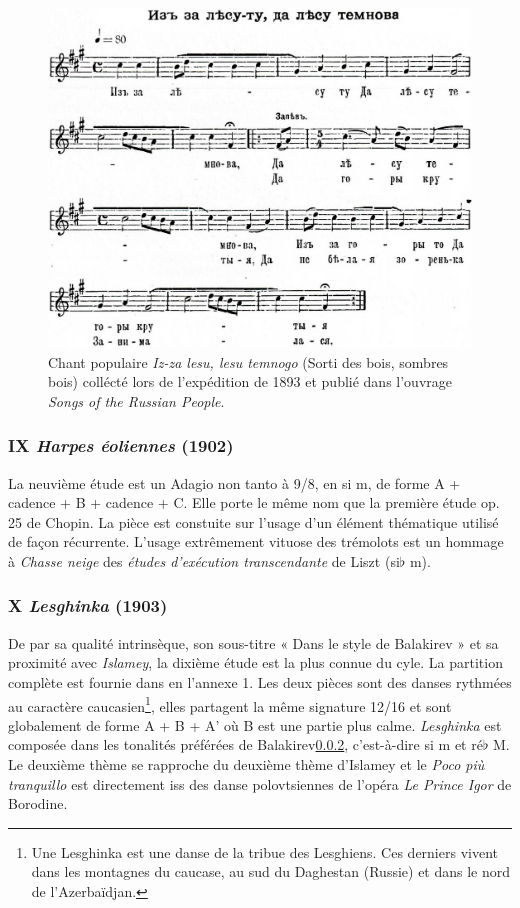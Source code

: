 \begin{figure}[!ht]
  \begin{bigcenter}
    \includegraphics[width=15.0cm, keepaspectratio]{woods.png}
  \end{bigcenter}
  \caption{\label{woods}Chant populaire \emph{Iz-za lesu, lesu temnogo} (Sorti des bois, sombres bois) collécté lors de l'expédition de 1893 et publié dans l'ouvrage \emph{Songs of the Russian People}.}
\end{figure}

\subsubsection{IX \emph{Harpes éoliennes} (1902)}

La neuvième étude est un Adagio non tanto à 9/8, en si m, de forme A + cadence + B + cadence + C. Elle porte le même nom que la première étude op. 25 de Chopin. La pièce est constuite sur l'usage d'un élément thématique utilisé de façon récurrente. L'usage extrêmement vituose des trémolots est un hommage à \emph{Chasse neige} des \emph{études d'exécution transcendante} de Liszt (si$\flat$ m).

\subsubsection{X \emph{Lesghinka} (1903)}

De par sa qualité intrinsèque, son sous-titre « Dans le style de Balakirev » et sa proximité avec \emph{Islamey}, la dixième étude est la plus connue du cyle. La partition complète est fournie dans en l'annexe 1. Les deux pièces sont des danses rythmées au caractère caucasien\footnote{Une Lesghinka est une danse de la tribue des Lesghiens. Ces derniers vivent dans les montagnes du caucase, au sud du Daghestan (Russie) et dans le nord de l'Azerbaïdjan.}, elles partagent la même signature 12/16 et sont globalement de forme A + B + A' où B est une partie plus calme. \emph{Lesghinka} est composée dans les tonalités préférées de Balakirev\ref{}, c'est-à-dire si m et ré$\flat$ M. Le deuxième thème se rapproche du deuxième thème d'Islamey et le \emph{Poco pi\`{u} tranquillo} est directement iss des danse polovtsiennes de l'opéra \emph{Le Prince Igor} de Borodine.

